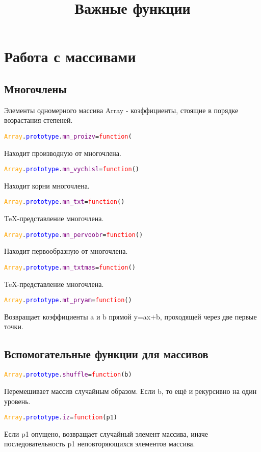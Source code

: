 

	\title{Важные функции}
	\section{Работа с массивами}
		\subsection{Многочлены}
		Элементы одномерного массива Array - коэффициенты, стоящие в порядке возрастания степеней.
			\begin{alltt}
				\textcolor{Orange}{Array}.\textcolor{Blue}{prototype}.\textcolor{Purple}{mn_proizv}=\textcolor{Red}{function}(
			\end{alltt}
		Находит производную от многочлена. 
			\begin{alltt}
				\textcolor{Orange}{Array}.\textcolor{Blue}{prototype}.\textcolor{Purple}{mn_vychisl}=\textcolor{Red}{function}()
			\end{alltt}
		Находит корни многочлена.
			\begin{alltt}
				\textcolor{Orange}{Array}.\textcolor{Blue}{prototype}.\textcolor{Purple}{mn_txt}=\textcolor{Red}{function}()
			\end{alltt}
		TeX-представление многочлена.%
			\begin{alltt}
				\textcolor{Orange}{Array}.\textcolor{Blue}{prototype}.\textcolor{Purple}{mn_pervoobr}=\textcolor{Red}{function}()
			\end{alltt}
		Находит первообразную от многочлена.%
			\begin{alltt}
				\textcolor{Orange}{Array}.\textcolor{Blue}{prototype}.\textcolor{Purple}{mn_txtmas}=\textcolor{Red}{function}()
			\end{alltt}
		TeX-представление многочлена.
			\begin{alltt}
				\textcolor{Orange}{Array}.\textcolor{Blue}{prototype}.\textcolor{Purple}{mt_pryam}=\textcolor{Red}{function}()
			\end{alltt}
		Возвращает коэффициенты a и b прямой y=ax+b, проходящей через две первые точки.
		\subsection{Вспомогательные функции для массивов}
			\begin{alltt}
				\textcolor{Orange}{Array}.\textcolor{Blue}{prototype}.\textcolor{Purple}{shuffle}=\textcolor{Red}{function}(b)
			\end{alltt}	
		Перемешивает массив случайным образом. Если b, то ещё и рекурсивно на один уровень.
			\begin{alltt}
				\textcolor{Orange}{Array}.\textcolor{Blue}{prototype}.\textcolor{Purple}{iz}=\textcolor{Red}{function}(p1)
			\end{alltt}
		Если p1 опущено, возвращает случайный элемент массива, иначе последовательность p1 неповторяющихся элементов массива.
